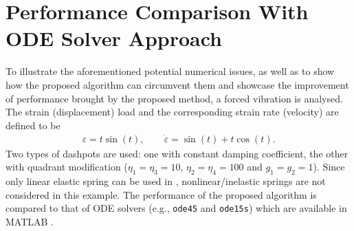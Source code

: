 \section{Performance Comparison With ODE Solver Approach}
To illustrate the aforementioned potential numerical issues, as well as to show how the proposed algorithm can circumvent them and showcase the improvement of performance brought by the proposed method, a forced vibration is analysed. The strain (displacement) load and the corresponding strain rate (velocity) are defined to be
\begin{gather}
\varepsilon=t\sin\left(t\right),\qquad{}\dot\varepsilon=\sin\left(t\right)+t\cos\left(t\right).
\end{gather}
Two types of dashpots are used: one with constant damping coefficient, the other with quadrant modification ($\eta_1=\eta_3=10$, $\eta_2=\eta_4=100$ and $g_1=g_2=1$). Since only linear elastic spring can be used in , nonlinear/inelastic springs are not considered in this example. The performance of the proposed algorithm is compared to that of ODE solvers (e.g., \texttt{ode45} and \texttt{ode15s}) which are available in MATLAB \citep{Shampine1997}.
